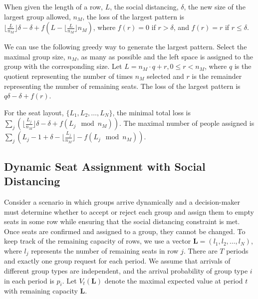 

\begin{lem}\label{lem_pattern}
When given the length of a row, $L$, the social distancing, $\delta$, the new size of the largest group allowed, $n_M$, the loss of the largest pattern is $\lfloor \frac{L}{n_M} \rfloor \delta - \delta + f(L - \lfloor \frac{L}{n_M} \rfloor n_M)$, where $f(r)=0$ if $r> \delta$, and $f(r)=r$ if $r \leq \delta$.
\end{lem}

We can use the following greedy way to generate the largest pattern. Select the maximal group size, $n_M$, as many as possible and the left space is assigned to the group with the corresponding size. Let $L = n_M \cdot q + r, 0 \leq r < n_M$, where $q$ is the quotient representing the number of times $n_M$ selected and $r$ is the remainder representing the number of remaining seats. The loss of the largest pattern is $q \delta -\delta + f(r)$.

\begin{prop}
For the seat layout, $\{L_1, L_2, \ldots, L_{N}\}$, the minimal total loss is $\sum_{j} (\lfloor \frac{L_j}{n_{M}} \rfloor \delta -\delta + f(L_j \mod n_{M}))$. The maximal number of people assigned is $\sum_{j} (L_j - 1+ \delta - \lfloor \frac{L_j}{n_{M}} \rfloor - f(L_j \mod n_{M}))$.
\end{prop}

\subsection{Dynamic Seat Assignment with Social Distancing}\label{sec_dynamic}
Consider a scenario in which groups arrive dynamically and a decision-maker must determine whether to accept or reject each group and assign them to empty seats in some row while ensuring that the social distancing constraint is met. Once seats are confirmed and assigned to a group, they cannot be changed. To keep track of the remaining capacity of rows, we use a vector $\mathbf{L} = (l_1, l_2, \ldots, l_N)$, where $l_j$ represents the number of remaining seats in row $j$. There are $T$ periods and exactly one group request for each period. We assume that arrivals of different group types are independent, and the arrival probability of group type $i$ in each period is $p_i$. Let $V_t(\mathbf{L})$ denote the maximal expected value at period $t$ with remaining capacity $\mathbf{L}$.

